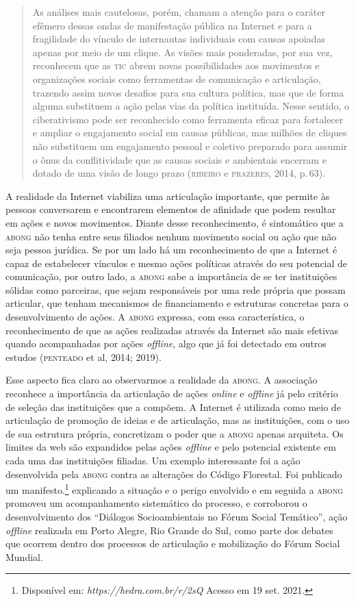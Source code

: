 \begin{quote}
As análises mais cautelosas, porém, chamam a atenção para o caráter
efêmero dessas ondas de manifestação pública na Internet e para a
fragilidade do vínculo de internautas individuais com causas apoiadas
apenas por meio de um clique. As visões mais ponderadas, por sua vez,
reconhecem que as \textsc{tic} abrem novas possibilidades aos movimentos e
organizações sociais como ferramentas de comunicação e articulação,
trazendo assim novos desafios para sua cultura política, mas que de
forma alguma substituem a ação pelas vias da política instituída. Nesse
sentido, o ciberativismo pode ser reconhecido como ferramenta eficaz
para fortalecer e ampliar o engajamento social em causas públicas, mas
milhões de cliques não substituem um engajamento pessoal e coletivo
preparado para assumir o ônus da conflitividade que as causas sociais e
ambientais encerram e dotado de uma visão de longo prazo (\textsc{ribeiro} e
\textsc{prazeres}, 2014, p.\,63).
\end{quote}

A realidade da Internet viabiliza uma articulação importante, que
permite às pessoas conversarem e encontrarem elementos de afinidade que
podem resultar em ações e novos movimentos. Diante desse reconhecimento,
é sintomático que a \textsc{abong} não tenha entre seus filiados nenhum movimento
social ou ação que não seja pessoa jurídica. Se por um lado há um
reconhecimento de que a Internet é capaz de estabelecer vínculos e mesmo
ações políticas através do seu potencial de comunicação, por outro lado,
a \textsc{abong} sabe a importância de se ter instituições sólidas como
parceiras, que sejam responsáveis por uma rede própria que possam
articular, que tenham mecanismos de financiamento e estruturas concretas
para o desenvolvimento de ações. A \textsc{abong} expressa, com essa
característica, o reconhecimento de que as ações realizadas através da
Internet são mais efetivas quando acompanhadas por ações \emph{offline}, algo
que já foi detectado em outros estudos (\textsc{penteado} et al, 2014; 2019).

Esse aspecto fica claro ao observarmos a realidade da \textsc{abong}. A
associação reconhece a importância da articulação de ações \emph{online} e
\emph{offline} já pelo critério de seleção das instituições que a compõem. A
Internet é utilizada como meio de articulação de promoção de ideias e de
articulação, mas as instituições, com o uso de sua estrutura própria,
concretizam o poder que a \textsc{abong} apenas arquiteta. Os limites da web são
expandidos pelas ações \emph{offline} e pelo potencial existente em cada uma
das instituições filiadas. Um exemplo interessante foi a ação
desenvolvida pela \textsc{abong} contra as alterações do Código Florestal. Foi
publicado um manifesto.\footnote{Disponível em:
  \emph{https://hedra.com.br/r/2sQ}
  Acesso em 19 set. 2021.} explicando a situação e o perigo envolvido e em
seguida a \textsc{abong} promoveu um acompanhamento sistemático do processo, e
corroborou o desenvolvimento dos ``Diálogos Socioambientais no Fórum
Social Temático'', ação \emph{offline} realizada em Porto Alegre, Rio Grande
do Sul, como parte dos debates que ocorrem dentro dos processos de
articulação e mobilização do Fórum Social Mundial.

